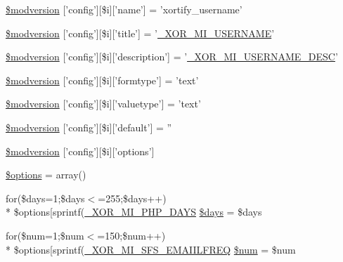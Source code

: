 \begin{DoxyCompactItemize}
\item 
\hyperlink{xoops__version_8php_a97bde72eb399d36cae8b92f0fe643e4c}{\$modversion} \mbox{[}'config'\mbox{]}\mbox{[}\$i\mbox{]}\mbox{[}'name'\mbox{]} = 'xortify\-\_\-username'
\item 
\hyperlink{xoops__version_8php_a2f084d4cbd766a0a77a22c3a0569d00a}{\$modversion} \mbox{[}'config'\mbox{]}\mbox{[}\$i\mbox{]}\mbox{[}'title'\mbox{]} = '\hyperlink{modinfo_8php_a3e1d80b4ffcc3e529cbb0a2c3e2890f1}{\-\_\-\-X\-O\-R\-\_\-\-M\-I\-\_\-\-U\-S\-E\-R\-N\-A\-M\-E}'
\item 
\hyperlink{xoops__version_8php_a5e9eb73a3e95f753e596d6a407eaa7e2}{\$modversion} \mbox{[}'config'\mbox{]}\mbox{[}\$i\mbox{]}\mbox{[}'description'\mbox{]} = '\hyperlink{modinfo_8php_a5b188b1e94189bc17f0be9b90f49c697}{\-\_\-\-X\-O\-R\-\_\-\-M\-I\-\_\-\-U\-S\-E\-R\-N\-A\-M\-E\-\_\-\-D\-E\-S\-C}'
\item 
\hyperlink{xoops__version_8php_a3a99fbd85eb007c5a24976ed7a746dc5}{\$modversion} \mbox{[}'config'\mbox{]}\mbox{[}\$i\mbox{]}\mbox{[}'formtype'\mbox{]} = 'text'
\item 
\hyperlink{xoops__version_8php_a565f7b70c886b13fc870233f5bfcbeec}{\$modversion} \mbox{[}'config'\mbox{]}\mbox{[}\$i\mbox{]}\mbox{[}'valuetype'\mbox{]} = 'text'
\item 
\hyperlink{xoops__version_8php_a8015bb547bd75a72113a2b7f832e0bf2}{\$modversion} \mbox{[}'config'\mbox{]}\mbox{[}\$i\mbox{]}\mbox{[}'default'\mbox{]} = ''
\item 
\hyperlink{xoops__version_8php_a2d446acc674eb0afef1c17e4237333c1}{\$modversion} \mbox{[}'config'\mbox{]}\mbox{[}\$i\mbox{]}\mbox{[}'options'\mbox{]}
\item 
\hyperlink{xoops__version_8php_a011800c63ece4cbbfa77136a20607023}{\$options} = array()
\item 
for(\$days=1;\$days$<$=255;\$days++) \\*
\$options\mbox{[}sprintf(\hyperlink{modinfo_8php_ab976f916a20fba3b01896f59e4f4af76}{\-\_\-\-X\-O\-R\-\_\-\-M\-I\-\_\-\-P\-H\-P\-\_\-\-D\-A\-Y\-S} \hyperlink{xoops__version_8php_a795feb91f53abe1674955a391b25baac}{\$days} = \$days
\item 
for(\$num=1;\$num$<$=150;\$num++) \\*
\$options\mbox{[}sprintf(\hyperlink{modinfo_8php_a4cc21ed8d2462d0f4d9ebd171cdde202}{\-\_\-\-X\-O\-R\-\_\-\-M\-I\-\_\-\-S\-F\-S\-\_\-\-E\-M\-A\-I\-I\-L\-F\-R\-E\-Q} \hyperlink{xoops__version_8php_a263e9411b798d19e344eb909462d41b7}{\$num} = \$num
\end{DoxyCompactItemize}


